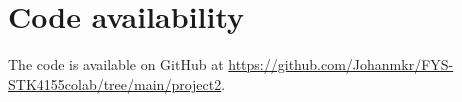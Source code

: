 

%


\section*{Code availability}
The code is available on GitHub at \url{https://github.com/Johanmkr/FYS-STK4155colab/tree/main/project2}.





